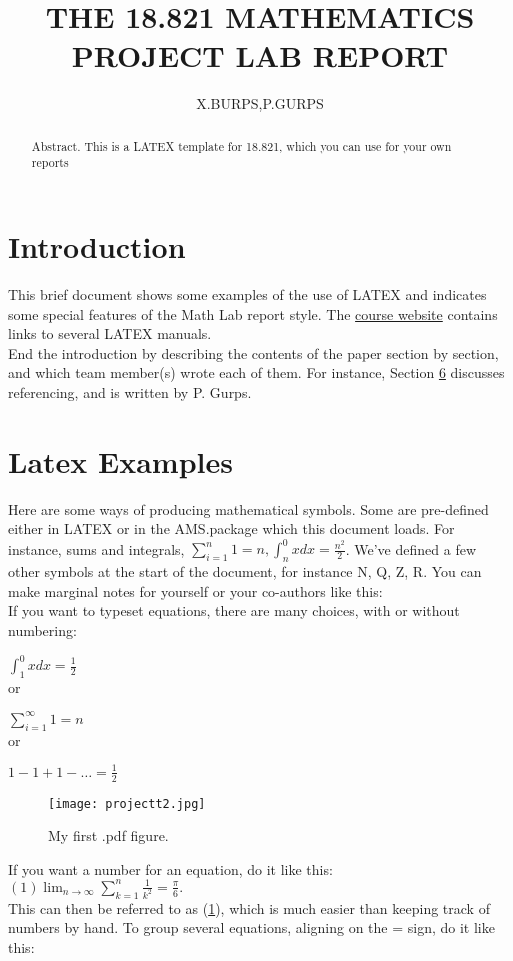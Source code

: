 \documentclass{article}
\title{\textbf{THE 18.821 MATHEMATICS PROJECT LAB REPORT\newline
[REPLACE THIS WITH YOUR OWN SHORT DESCRIPTIVE TITLE!]}}
\author{X.BURPS,P.GURPS}
\begin{document}
\maketitle
\begin{abstract}
	Abstract. This is a LATEX template for 18.821, which you can
use for your own reports
  
	  
\end{abstract}
\section{Introduction}
\centering
This brief document shows some examples of the use of LATEX and
indicates some special features of the Math Lab report style. The
\textcolor{blue}{\url{course website}} contains links to several LATEX manuals.\\
         End the introduction by describing the contents of the paper section by section, and which team member(s) wrote each of them. For
instance, Section \textcolor{blue}{\url{6}} discusses referencing, and is written by P. Gurps.
\section{Latex Examples}
Here are some ways of producing mathematical symbols. Some are
pre-defined either in LATEX or in the AMS.package which this document  loads. For instance, sums and integrals, $\sum_{i=1}^{n} 1 =n,  \int^0_n xdx= \frac{n^2}{2}$. We’ve defined a few other symbols at the start of the document, for
instance N, Q, Z, R. You can make marginal notes for yourself or your
co-authors like this:\\
If you want to typeset equations, there are many choices, with or
without numbering:\\
\centering

$\int^0_1 xdx= \frac{1}{2}$\\

or
 
 $\sum_{i=1}^{\infty} 1 =n$\\
or

$1-1+1-\ldots=\frac{1}{2}$\\
\begin{figure}[h]
    \centering
    \texttt{[image: projectt2.jpg]}
    \caption{My first .pdf figure.}
    \label{fig:first}
\end{figure}

If you want a number for an equation, do it like this:\\
$(1) \lim_{n\to\infty}
\sum_{k=1}^{n} \frac{1}{k^2}=\frac{\pi}{6}.$\\
This can then be referred to as (\textcolor{blue}{\url{1}}), which is much easier than keeping
track of numbers by hand. To group several equations, aligning on the
= sign, do it like this:\\
\end{document}
